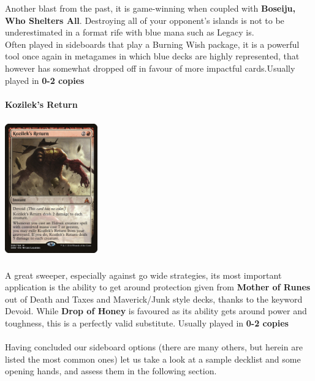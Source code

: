 \documentclass{report}
\begin{document}
Another blast from the past, it is game-winning when coupled with \textbf{Boseiju, Who Shelters All}. Destroying all of your opponent's islands is not to be underestimated in a format rife with blue mana such as Legacy is.\\Often played in sideboards that play a Burning Wish package, it is a powerful tool once again in metagames in which blue decks are highly represented, that however has somewhat dropped off in favour of more impactful cards.Usually played in \textbf{0-2 copies}\\\\
\textbf{Kozilek's Return\\}
\begin{center}
\includegraphics [width = 4cm, height = 6cm] {kozileks-return}
\end{center}
A great sweeper, especially against go wide strategies, its most important application is the ability to get around protection given from \textbf{Mother of Runes} out of Death and Taxes and Maverick/Junk style decks, thanks to the keyword Devoid. While \textbf{Drop of Honey} is favoured as its ability gets around power and toughness, this is a perfectly valid substitute. Usually played in \textbf{0-2 copies}\\\\
Having concluded our sideboard options (there are many others, but herein are listed the most common ones) let us take a look at a sample decklist and some opening hands, and assess them in the following section.\\
\end{document}
